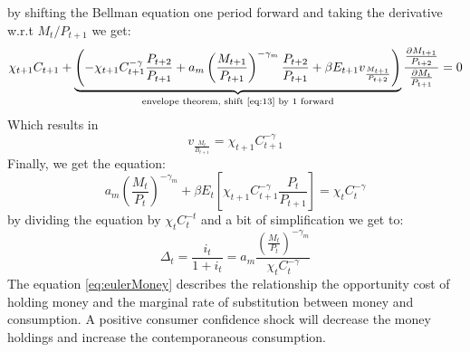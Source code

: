 \documentclass[10pt,a4paper]{article}
\begin{document}
by shifting the Bellman equation one period forward and taking the derivative w.r.t $M_{t}/P_{t+1}$ we get:
\begin{equation}\label{eq:14}
\chi_{t+1}C_{t+1}+\underbrace{\left(-\chi_{t+1}C_{t+1}^{-\gamma}\frac{P_{t+2}}{P_{t+1}}+a_m\left(\frac{M_{t+1}}{P_{t+1}}\right)^{-\gamma_m}\frac{P_{t+2}}{P_{t+1}}+\beta E_{t+1}v_{\frac{M_{t+1}}{P_{t+2}}}\right)}_{\text{envelope theorem, shift \eqref{eq:13} by 1 forward}}\frac{\frac{\partial M_{t+1}}{P_{t+2}}}{\frac{\partial M_{t}}{P_{t+1}}}=0
\end{equation}
Which results in
\begin{equation*}
v_{\frac{M_{t}}{B_{t+1}}} = \chi_{t+1}C_{t+1}^{-\gamma}
\end{equation*}
Finally, we get the equation:
\begin{equation}\label{eq:eulerMoney}
a_{m}\left(\frac{M_{t}}{P_{t}}\right)^{-\gamma_{m}}+\beta E_{t}\left[\chi_{t+1}C_{t+1}^{-\gamma}\frac{P_{t}}{P_{t+1}}\right]=\chi_{t}C_{t}^{-\gamma}
\end{equation}
by dividing the equation by $\chi_{t}C_{t}^{-t}$ and a bit of simplification we get to:
\begin{equation}
\Delta_{t}=\frac{i_{t}}{1+i_{t}}=a_{m}\frac{\left(\frac{M_{t}}{P_{t}}\right)^{-\gamma_{m}}}{\chi_{t}C_{t}^{-\gamma}}
\end{equation}
The equation \eqref{eq:eulerMoney} describes the relationship the opportunity cost of holding money and the marginal rate of substitution between money and consumption. A positive consumer confidence shock will decrease the money holdings and increase the contemporaneous consumption.
\end{document}
